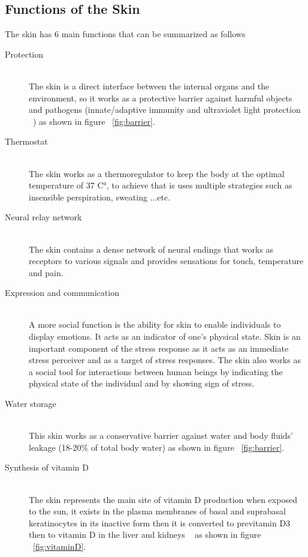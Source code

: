 \subsection{Functions of the Skin}
The skin has 6 main functions that can be summarized as follows~\cite{sarah2021}
\begin{description}
\item[Protection] \hfill \\
            The skin is a direct interface between the internal organs and the environment, so it works as a protective barrier against harmful objects and pathogens (innate/adaptive immunity and ultraviolet light protection  ~\cite{joseph2020}) as shown in figure ~\ref{fig:barrier}.
            
\item[Thermostat] \hfill \\
            The skin works as a thermoregulator to keep the body at the optimal temperature of 37 C°, to achieve that is uses multiple strategies such as insensible perspiration, sweating ...etc.
\item[Neural relay network] \hfill \\
            The skin contains a dense network of neural endings that works as receptors to various signals and provides sensations for touch, temperature and pain.
\item[Expression and communication] \hfill \\
            A more social function
            is the ability for skin to enable individuals to display
            emotions. It acts as an indicator of one’s physical state.
            Skin is an important component of the stress response as it
            acts as an immediate stress perceiver and as a target of
            stress responses.
            The skin also works as a social tool for interactions between human beings by indicating the physical state of the individual and by showing sign of stress.
\item[Water storage] \hfill \\
            This skin works as a conservative barrier against water and body fluids' leakage (18-20\% of total body water) as shown in figure ~\ref{fig:barrier}.
\item[Synthesis of vitamin D] \hfill \\
            The skin represents the main site of vitamin D production when exposed to the sun, it exists in the plasma membranes of basal and suprabasal keratinocytes in its inactive form then it is converted to previtamin D3 then to vitamin D in the liver and kidneys  ~\cite{joseph2020} as shown in figure ~\ref{fig:vitaminD}.
\end{description}
